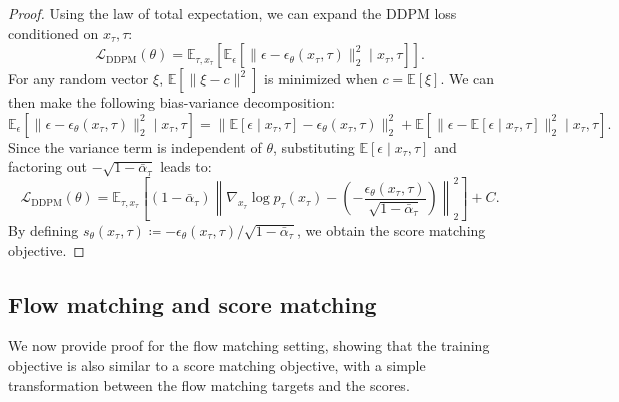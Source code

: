 \begin{proof}
Using the law of total expectation, we can expand the DDPM loss conditioned on $x_\tau, \tau$:
\begin{equation}
\mathcal{L}_\text{DDPM}(\theta) = \mathbb{E}_{\tau, x_\tau} \left[\mathbb{E}_{\epsilon} \left[ \|\epsilon - \epsilon_\theta(x_\tau, \tau)\|_2^2 \mid x_\tau, \tau \right] \right].
\end{equation}
For any random vector $\xi$, $\mathbb{E}[\|\xi - c\|^2]$ is minimized when $c = \mathbb{E}[\xi]$. We can then make the following bias-variance decomposition:
\begin{equation}
\mathbb{E}_{\epsilon} \left[ \|\epsilon - \epsilon_\theta(x_\tau, \tau)\|_2^2 \mid x_\tau, \tau \right] = \|\mathbb{E}[\epsilon \mid x_\tau, \tau] - \epsilon_\theta(x_\tau, \tau)\|_2^2 + \mathbb{E}\left[\|\epsilon - \mathbb{E}[\epsilon \mid x_\tau, \tau]\|_2^2 \mid x_\tau, \tau\right].
\end{equation}
Since the variance term is independent of $\theta$, substituting $\mathbb{E}[\epsilon\mid x_\tau, \tau]$ and factoring out $-\sqrt{1 - \bar{\alpha}_\tau}$ leads to:
\begin{equation}
\mathcal{L}_\text{DDPM}(\theta) = \mathbb{E}_{\tau, x_\tau} \left[ (1 - \bar{\alpha}_\tau) \left\| \nabla_{x_\tau}\log p_\tau(x_\tau) - \left( -\frac{\epsilon_\theta(x_\tau, \tau)}{\sqrt{1 - \bar{\alpha}_\tau}} \right) \right\|_2^2 \right] + C.
\end{equation}
By defining $s_\theta(x_\tau, \tau) \coloneqq -\epsilon_\theta(x_\tau, \tau)/\sqrt{1 - \bar{\alpha}_\tau}$, we obtain the score matching objective.
\end{proof}

\subsection{Flow matching and score matching}\label{sec:proof_flowmatch_score}

We now provide proof for the flow matching setting, showing that the training objective is also similar to a score matching objective, with a simple transformation between the flow matching targets and the scores.

